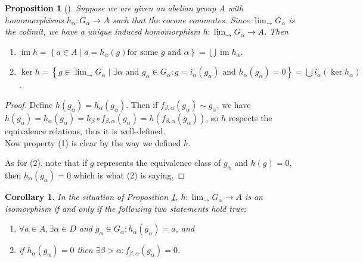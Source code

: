 \documentclass[reqno]{amsart}
\newtheorem{proposition}[theorem]{Proposition}
\newtheorem{corollary}[theorem]{Corollary}
\theoremstyle{definition}
\theoremstyle{remark}
\DeclareMathOperator{\im}{im}
\begin{document}
\begin{proposition}[]\label{Prop:OXKXKCL}
    Suppose we are given an abelian group
    $A$ with homomorphisms
    $h_{\alpha} \colon G_{\alpha} \to A$ 
    such that the cocone commutes.
    Since $\lim_{\rightarrow} G_{\alpha}$ is the colimit, we
    have a unique induced homomorphism
    $h \colon \lim_{\rightarrow} G_{\alpha} \to A$.
    Then
    \begin{enumerate}
        \item $\im h = 
            \left\{ a \in A \mid a = h_{\alpha}(g) \text{
            for some } g \text{ and } \alpha \right\} 
            = \bigcup \im h_{\alpha} $.
        \item $\ker h = 
            \left\{ g \in \lim_{\rightarrow} G_{\alpha}  \mid 
            \exists \alpha \text{ and } 
        g_{\alpha} \in G_{\alpha} \colon g = 
    i_{\alpha}(g_{\alpha}) \text{ and }
h_{\alpha}(g_{\alpha}) = 0\right\} = 
\bigcup i_{\alpha}(\ker h_{\alpha}) $.
    \end{enumerate}
\end{proposition}

\begin{proof}
    Define $h (g_{\alpha}) = 
    h_{\alpha}(g_{\alpha})$. Then if
    $f_{\beta,\alpha}(g_{\alpha}) \sim g_{\alpha}$, we have
    $h\left( g_{\alpha} \right) 
    = h_{\alpha}\left( g_{\alpha} \right) 
    = h_{\beta} \circ f_{\beta,\alpha}(g_{\alpha})
    = h \left( f_{\beta,\alpha}(g_{\alpha}) \right) $, so
    $h$ respects the equivalence relations, thus it
    is well-defined.\\
    Now property (1) is clear by the way we defined $h$.

    As for (2), note that 
    if $g$ represents the equivalence class
    of $g_{\alpha}$ and
    $h(g) = 0$, then
    $h_{\alpha}\left( g_{\alpha} \right) = 0$ which
    is what (2) is saying.
\end{proof}

\begin{corollary}
    In the situation of Proposition
    \ref{Prop:OXKXKCL},
    $h \colon \lim_{\rightarrow} G_{\alpha} \to A$ is an
    isomorphism if and only if the following two statements
    hold true:
    \begin{enumerate}
        \item $\forall a \in A, \exists \alpha \in D$ and
            $g_{\alpha} \in G_{\alpha} \colon
            h_{\alpha}(g_{\alpha}) = a$, and
        \item if $h_{\alpha}(g_{\alpha}) = 0$ then
            $\exists \beta > \alpha \colon f_{\beta,\alpha}
            (g_{\alpha}) = 0$.
    \end{enumerate}
\end{corollary}
\end{document}
